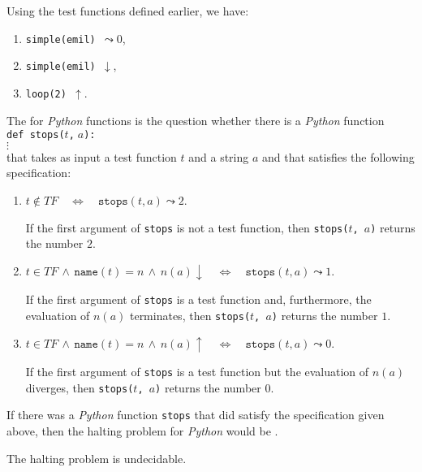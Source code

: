 \examplesEng  Using the test functions defined earlier, we have:
\begin{enumerate}
\item {\tt simple(emil) $\leadsto 0$},
\item {\tt simple(emil) $\downarrow$},
\item {\tt loop(2) $\uparrow$}.
\end{enumerate}

\noindent
The  for \textsl{Python} functions is the question whether there is a
\textsl{Python} function \\[0.2cm]
\hspace*{1.3cm} \texttt{def stops($t$,$\;a$): } \\
\hspace*{2.3cm} $\vdots$
\\[0.2cm] 
that takes as input a test function $t$ and a string $a$ and that satisfies the following specification:
\begin{enumerate}
\item $t \not\in T\!F \quad\Leftrightarrow\quad \mathtt{stops}(t, a) \leadsto 2$.

      If the first argument of \texttt{stops} is not a test function, then 
      \texttt{stops($t$, $a$)} returns the number $2$.

\item $t \in T\!F \,\wedge\, \mathtt{name}(t) = n \,\wedge\, n(a)\downarrow \quad\Leftrightarrow\quad
       \mathtt{stops}(t, a) \leadsto 1$.

      If the first argument of \texttt{stops} is a test function and, furthermore,
      the evaluation of $n(a)$ terminates, then \texttt{stops($t$, $a$)} returns the number $1$.

\item $t \in T\!F \,\wedge\, \mathtt{name}(t) = n \,\wedge\, n(a)\uparrow \quad\Leftrightarrow\quad
       \mathtt{stops}(t, a) \leadsto 0$.

      If the first argument of \texttt{stops} is a test function but the evaluation of $n(a)$ 
      diverges, then \linebreak
      \texttt{stops($t$, $a$)} returns the number $0$.
\end{enumerate}
If there was a \textsl{Python} function \texttt{stops} that did satisfy the specification given above,
then the halting problem for \textsl{Python} would be .

\begin{Theorem}
  The halting problem is undecidable.
\end{Theorem}

